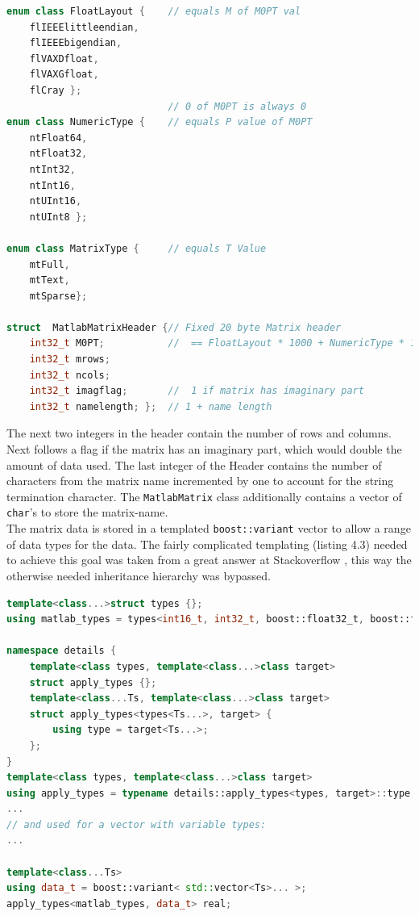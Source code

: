 \begin{lstlisting}[language=C++, caption=A code snippet showing the used enums and structs in the MATLAB header.]
enum class FloatLayout {  	// equals M of M0PT val
    flIEEElittleendian,
    flIEEEbigendian,
    flVAXDfloat,
    flVAXGfloat,
    flCray };
							// 0 of M0PT is always 0
enum class NumericType { 	// equals P value of M0PT
    ntFloat64,
    ntFloat32,
    ntInt32,
    ntInt16,
    ntUInt16,
    ntUInt8 };

enum class MatrixType {  	// equals T Value
    mtFull,
    mtText,
    mtSparse};

struct  MatlabMatrixHeader {// Fixed 20 byte Matrix header
    int32_t M0PT;  			//  == FloatLayout * 1000 + NumericType * 10 + MatrixType
    int32_t mrows;
    int32_t ncols;
    int32_t imagflag;   	//  1 if matrix has imaginary part
    int32_t namelength; }; 	// 1 + name length
\end{lstlisting}

The next two integers in the header contain the number of rows and columns. Next follows a flag if the matrix has an imaginary part, which would double the amount of data used. The last integer of the Header contains the number of characters from the matrix name incremented by one to account for the string termination character.
The \texttt{MatlabMatrix} class additionally contains a vector of \texttt{char}'s to store the matrix-name.\\
The matrix data is stored in a templated \texttt{boost::variant} vector to allow a range of data types for the data. The fairly complicated templating (listing 4.3) needed to achieve this goal was taken from  a great answer at Stackoverflow \cite{stackof}, this way the otherwise needed inheritance hierarchy was bypassed. 
\begin{lstlisting}[language=C++, caption=A code snippet showing the templating to allow various types in a Boost variant.]
template<class...>struct types {};
using matlab_types = types<int16_t, int32_t, boost::float32_t, boost::float64_t, uint8_t, uint16_t>;

namespace details {
    template<class types, template<class...>class target>
    struct apply_types {};
    template<class...Ts, template<class...>class target>
    struct apply_types<types<Ts...>, target> {
        using type = target<Ts...>;
    };
}
template<class types, template<class...>class target>
using apply_types = typename details::apply_types<types, target>::type;
...
// and used for a vector with variable types:
...

template<class...Ts>
using data_t = boost::variant< std::vector<Ts>... >;
apply_types<matlab_types, data_t> real;
\end{lstlisting}
